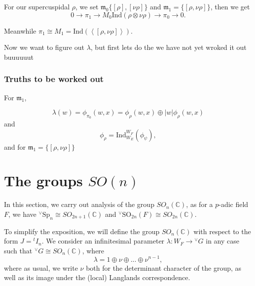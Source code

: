 \documentclass{memoir}
\newcommand{\mf}{\mathfrak}
\newcommand{\la}{\left\langle}
\newcommand{\ra}{\right\rangle}
\newcommand{\bc}{\mathbb{C}}
\newcommand{\tx}{\text}
\newcommand{\ten}{\otimes}
\theoremstyle{definition}
\begin{document}
	For our supercuspidal $\rho$, we set $\mf{m}_0\{[\rho], [\nu\rho]\}$ and $\mf{m}_1=\{[\rho, \nu\rho]\}$, then we get 
	$$0\to\pi_1\to M_0\tx{Ind}(\rho\ten\nu\rho)\to\pi_0\to 0.$$
	
	Meanwhile $\pi_1\cong M_1=\tx{Ind}(\la[\rho, \nu\rho]\ra)$.  
	
	Now we want to figure out $\lambda$, but first lets do the 
	we have not yet wroked it out buuuuuut
	
	\subsection{Truths to  be worked out}
	
	For $\mf{m}_1$, 
	
	$$\lambda(w)=\phi_{\pi_0}(w, x)=\phi_\rho(w, x)\oplus |w|\phi_\rho(w, x)$$
	and 
	$$\phi_\rho=\tx{Ind}_{W_E}^{W_F}(\phi_\psi),$$
	and for $\mf{m}_1=\{[\rho, \nu\rho]\}$
	
	
	
	
	
	
	
	
	
	
	
	
	
	
	
	
	
	
	
	
	\chapter{The groups $SO(n)$}
	
	In this section, we carry out analysis of the group $SO_n(\bc)$, as for a $p$-adic field $F$, we have ${}^\vee \tx{Sp}_n\cong SO_{2n+1}(\bc)$ and ${}^\vee \tx{SO}_{2n}(F)\cong SO_{2n}(\bc)$.  
	
	To simplify the exposition, we will define the group $SO_n(\bc)$ with respect to the form $J={}^tI_n$.  
	We consider an infinitesimal parameter $\lambda:W_F\to{}^\vee G$ in any case such that ${}^\vee G\cong SO_n(\bc)$, where
	$$\lambda=1\oplus \nu \oplus... \oplus \nu^{n-1},$$
	where as usual, we write $\nu$ both for the determinant character of the group, as well as its image under the (local) Langlands correspondence. 
	
\end{document}
